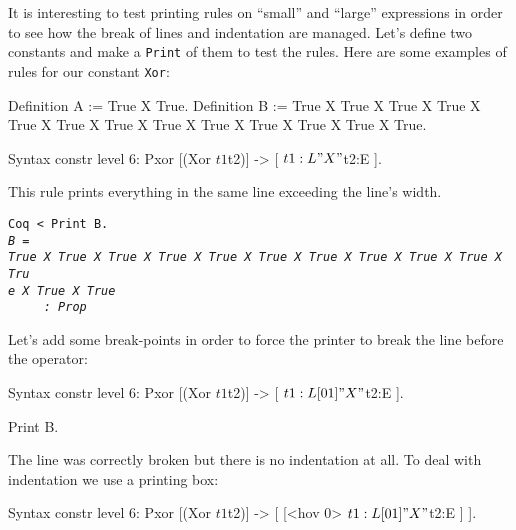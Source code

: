 {\begin{enumerate}
It is interesting to test printing rules on ``small'' and ``large''
expressions in order to see how the break of lines and indentation are
managed. Let's define two constants and make a \verb+Print+ of them to
test the rules.  Here are some examples of rules for our constant
\verb+Xor+:

\begin{coq_example*} 
Definition A := True X True.
Definition B := True X True X True X True X True X True X True 
                 X True X True X True X True X True X True.
\end{coq_example*}
\begin{coq_example*}
Syntax constr level 6:
  Pxor [(Xor $t1 $t2)] -> [ $t1:L " X " $t2:E ].
\end{coq_example*}


This rule prints everything in the same line exceeding the line's
width.


\begin{small}
\begin{flushleft}
\verb!Coq < Print B.!\\
\texttt{\textit{B~=~}}\\
\texttt{\textit{True~X~True~X~True~X~True~X~True~X~True~X~True~X~True~X~True~X~True~X~Tru}}\\
\texttt{\textit{e~X~True~X~True}}\\
\texttt{\textit{~~~~~:~Prop}}\\
\end{flushleft}
\end{small}

Let's add some break-points in order to force the printer to break the
line before the operator:

\begin{coq_example*}
Syntax constr level 6:
  Pxor [(Xor $t1 $t2)] -> [ $t1:L [0 1] " X " $t2:E ].
\end{coq_example*}

\begin{coq_example}
Print B.
\end{coq_example}

The line was correctly broken but there is no indentation at all. To
deal with indentation we use a printing box:

\begin{coq_example*}
Syntax constr level 6:
  Pxor [(Xor $t1 $t2)] ->
   [ [<hov 0> $t1:L [0 1] " X " $t2:E ] ].
\end{coq_example*}


\end{enumerate}}

